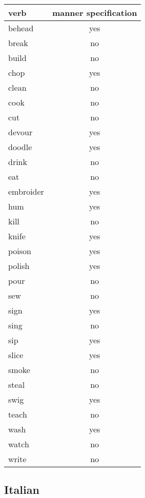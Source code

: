 \begin{longtable}{l|c}
\textbf{verb}     & \textbf{manner specification}    \\
\hline
\endhead
behead    & yes      \\
break     & no       \\
build     & no       \\
chop      & yes      \\
clean     & no       \\
cook      & no       \\
cut       & no       \\
devour    & yes      \\
doodle    & yes      \\
drink     & no       \\
eat       & no       \\
embroider & yes      \\
hum       & yes      \\
kill      & no       \\
knife     & yes      \\
poison    & yes      \\
polish    & yes      \\
pour      & no       \\
sew       & no       \\
sign      & yes      \\
sing      & no       \\
sip       & yes      \\
slice     & yes      \\
smoke     & no       \\
steal     & no       \\
swig      & yes      \\
teach     & no       \\
wash      & yes      \\
watch     & no       \\
write     & no      
\end{longtable}


\subsection{Italian}

